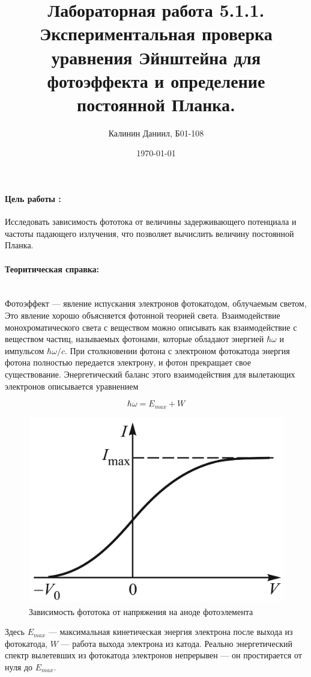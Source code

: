 \documentclass[a4paper, 12pt]{article}
\author{Калинин Даниил, Б01-108}
\date{\today}
\title{Лабораторная работа 5.1.1. Экспериментальная проверка уравнения Эйнштейна для фотоэффекта и определение постоянной Планка.}
\newcommand{\parag}[1]{\paragraph*{#1:}}
\begin{document}
\maketitle
\parindent=0cm

\parag {Цель работы }
Исследовать зависимость фототока от величины задерживающего потенциала и частоты падающего излучения, что позволяет вычислить величину постоянной Планка.


\parag {Теоритическая справка} ~\\

Фотоэффект --- явление испускания электронов фотокатодом, облучаемым светом,  Это явление хорошо объясняется фотонной теорией света. Взаимодействие монохроматического света с веществом можно описывать
как взаимодействие с веществом частиц, называемых фотонами, которые обладают энергией $ \hbar \omega $ и импульсом $ \hbar\omega/c $. При столкновении фотона с электроном фотокатода энергия фотона полностью передается электрону, и фотон прекращает свое существование. Энергетический баланс этого взаимодействия для вылетающих электронов
описывается уравнением

\begin{equation}\label{energy balance}
\hbar \omega = E_{max} + W
\end{equation}

\begin{figure}[H]
    \centering
    \includegraphics[scale=0.3]{I(V)}
    \caption{Зависимость фототока от напряжения на аноде фотоэлемента}
    \label{ris I(V)}
\end{figure}

Здесь $ E_{max} $ ---  максимальная кинетическая энергия электрона после выхода из фотокатода, $ W $ --- работа выхода электрона из катода. Реально энергетический спектр вылетевших из фотокатода электронов непрерывен --- он простирается от нуля до $ E_{max} $. 
\end{document}
